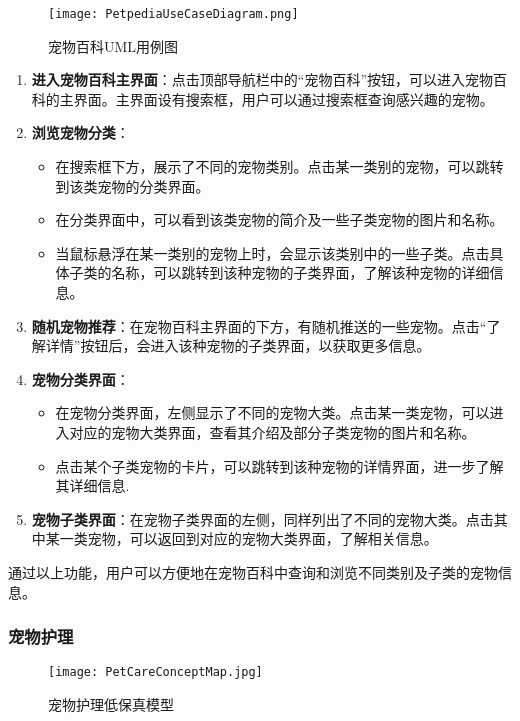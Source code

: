 \begin{figure}[H]
	\centering
	\texttt{[image: PetpediaUseCaseDiagram.png]}
	\caption{宠物百科UML用例图}
	\label{UserInterfaceConceptMap}
\end{figure}

\begin{enumerate}
	\item \textbf{进入宠物百科主界面}：点击顶部导航栏中的“宠物百科”按钮，可以进入宠物百科的主界面。主界面设有搜索框，用户可以通过搜索框查询感兴趣的宠物。
	\item \textbf{浏览宠物分类}：
	\begin{itemize}
		\item 在搜索框下方，展示了不同的宠物类别。点击某一类别的宠物，可以跳转到该类宠物的分类界面。
		\item 在分类界面中，可以看到该类宠物的简介及一些子类宠物的图片和名称。
		\item 当鼠标悬浮在某一类别的宠物上时，会显示该类别中的一些子类。点击具体子类的名称，可以跳转到该种宠物的子类界面，了解该种宠物的详细信息。
	\end{itemize}
	\item \textbf{随机宠物推荐}：在宠物百科主界面的下方，有随机推送的一些宠物。点击“了解详情”按钮后，会进入该种宠物的子类界面，以获取更多信息。
	\item \textbf{宠物分类界面}：
	\begin{itemize}
		\item 在宠物分类界面，左侧显示了不同的宠物大类。点击某一类宠物，可以进入对应的宠物大类界面，查看其介绍及部分子类宠物的图片和名称。
		\item 点击某个子类宠物的卡片，可以跳转到该种宠物的详情界面，进一步了解其详细信息.
	\end{itemize}
	\item \textbf{宠物子类界面}：在宠物子类界面的左侧，同样列出了不同的宠物大类。点击其中某一类宠物，可以返回到对应的宠物大类界面，了解相关信息。
\end{enumerate}

通过以上功能，用户可以方便地在宠物百科中查询和浏览不同类别及子类的宠物信息。

\subsubsection{宠物护理}

\begin{figure}[H]
	\centering
	\texttt{[image: PetCareConceptMap.jpg]}
	\caption{宠物护理低保真模型}
	\label{PetCareConceptMap}
\end{figure}

